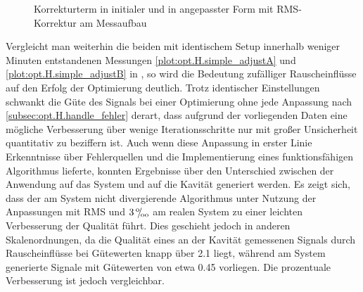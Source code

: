 \documentclass[../Report.tex]{subfiles}
\begin{document}
 \fabsOrig 
{} \fabsRMSone 

\begin{figure}[htb]

\caption{Korrekturterm in initialer und in angepasster Form mit RMS- Korrektur am Messaufbau}
\label{fig:opt.H.RMS_fabs}

\end{figure}

\noindent
Vergleicht man weiterhin die beiden mit identischem Setup innerhalb weniger Minuten entstandenen Messungen \ref{plot:opt.H.simple_adjustA} und \ref{plot:opt.H.simple_adjustB} in , so wird die Bedeutung zufälliger Rauscheinflüsse auf den Erfolg der Optimierung deutlich. Trotz identischer Einstellungen schwankt die Güte des Signals bei einer Optimierung ohne jede Anpassung nach \ref{subsec:opt.H.handle_fehler} derart, dass aufgrund der vorliegenden Daten eine mögliche Verbesserung über wenige Iterationsschritte nur mit großer Unsicherheit quantitativ zu beziffern ist.
Auch wenn diese Anpassung in erster Linie Erkenntnisse über Fehlerquellen und die Implementierung eines funktionsfähigen Algorithmus lieferte, konnten Ergebnisse über den Unterschied zwischen der Anwendung auf das \mock System und auf die Kavität generiert werden. Es zeigt sich, dass der am \mock System nicht divergierende Algorithmus unter Nutzung der Anpassungen mit RMS und $3 \, {}^\text{o}\mkern-5mu/\mkern-3mu_\text{oo}$ am realen System zu einer leichten Verbesserung der Qualität führt. Dies geschieht jedoch in anderen Skalenordnungen, da die Qualität eines an der Kavität gemessenen Signals durch Rauscheinflüsse bei Gütewerten knapp über 2.1 liegt, während am \mock System generierte Signale mit Gütewerten von etwa 0.45 vorliegen. Die prozentuale Verbesserung ist jedoch vergleichbar.
\end{document}
